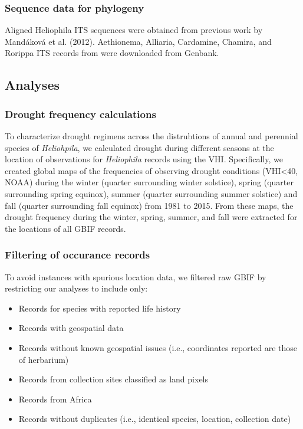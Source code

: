 \documentclass[man,floatsintext]{apa6}
\providecommand{\tightlist}{%
  \setlength{\itemsep}{0pt}\setlength{\parskip}{0pt}}
\theoremstyle{definition}
\theoremstyle{definition}
\theoremstyle{definition}
\theoremstyle{remark}
\begin{document}
\hypertarget{sequence-data-for-phylogeny}{%
\subsubsection{Sequence data for
phylogeny}\label{sequence-data-for-phylogeny}}

Aligned Heliophila ITS sequences were obtained from previous work by
Mandáková et al. (2012). Aethionema, Alliaria, Cardamine, Chamira, and
Rorippa ITS records from were downloaded from Genbank.

\hypertarget{analyses}{%
\subsection{Analyses}\label{analyses}}

\hypertarget{drought-frequency-calculations}{%
\subsubsection{Drought frequency
calculations}\label{drought-frequency-calculations}}

To characterize drought regimens across the distrubtions of annual and
perennial species of \emph{Heliohpila}, we calculated drought during
different seasons at the location of observations for \emph{Heliophila}
records using the VHI. Specifically, we created global maps of the
frequencies of observing drought conditions (VHI\textless{}40, NOAA)
during the winter (quarter surrounding winter solstice), spring (quarter
surrounding spring equinox), summer (quarter surrounding summer
solstice) and fall (quarter surrounding fall equinox) from 1981 to 2015.
From these maps, the drought frequency during the winter, spring,
summer, and fall were extracted for the locations of all GBIF records.

\hypertarget{filtering-of-occurance-records}{%
\subsubsection{Filtering of occurance
records}\label{filtering-of-occurance-records}}

To avoid instances with spurious location data, we filtered raw GBIF by
restricting our analyses to include only:

\begin{itemize}
\tightlist
\item
  Records for species with reported life history\\
\item
  Records with geospatial data\\
\item
  Records without known geospatial issues (i.e., coordinates reported
  are those of herbarium)\\
\item
  Records from collection sites classified as land pixels\\
\item
  Records from Africa\\
\item
  Records without duplicates (i.e., identical species, location,
  collection date)
\end{itemize}
\end{document}
